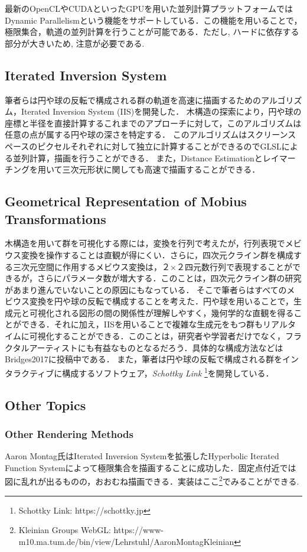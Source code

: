 最新のOpenCLやCUDAといったGPUを用いた並列計算プラットフォームではDynamic Parallelismという機能をサポートしている．この機能を用いることで，極限集合，軌道の並列計算を行うことが可能である．ただし, ハードに依存する部分が大きいため, 注意が必要である.

\subsection{Iterated Inversion System}
筆者らは円や球の反転で構成される群の軌道を高速に描画するためのアルゴリズム，Iterated Inversion System (IIS)\cite{iis}を開発した．
木構造の探索により，円や球の座標と半径を直接計算するこれまでのアプローチに対して，このアルゴリズムは任意の点が属する円や球の深さを特定する．
このアルゴリズムはスクリーンスペースのピクセルそれぞれに対して独立に計算することができるのでGLSLによる並列計算，描画を行うことができる．
また，Distance Estimationとレイマーチングを用いて三次元形状に関しても高速で描画することができる．

\subsection{Geometrical Representation of Mobius Transformations}

木構造を用いて群を可視化する際には，変換を行列で考えたが，行列表現でメビウス変換を操作することは直観が得にくい．さらに，四次元クライン群を構成する三次元空間に作用するメビウス変換は，２×２四元数行列で表現することができるが，さらにパラメータ数が増大する．このことは，四次元クライン群の研究があまり進んでいないことの原因にもなっている．
そこで筆者らはすべてのメビウス変換を円や球の反転で構成することを考えた．円や球を用いることで，生成元と可視化される図形の間の関係性が理解しやすく，幾何学的な直観を得ることができる．それに加え，IISを用いることで複雑な生成元をもつ群もリアルタイムに可視化することができる．このことは，研究者や学習者だけでなく，フラクタルアーティストにも有益なものとなるだろう．具体的な構成方法などはBridges2017に投稿中である．
また，筆者は円や球の反転で構成される群をインタラクティブに構成するソフトウェア，{\it Schottky Link} \footnote{Schottky Link: https://schottky.jp}を開発している．

\subsection{Other Topics}

\subsubsection{Other Rendering Methods}
Aaron Montag氏はIterated Inversion Systemを拡張したHyperbolic Iterated Function Systemによって極限集合を描画することに成功した\cite{hyperbolicIFS}．固定点付近では図に乱れが出るものの，おおむね描画できる．実装はここ\footnote{Kleinian Groups WebGL: https://www-m10.ma.tum.de/bin/view/Lehrstuhl/AaronMontagKleinian}でみることができる.

